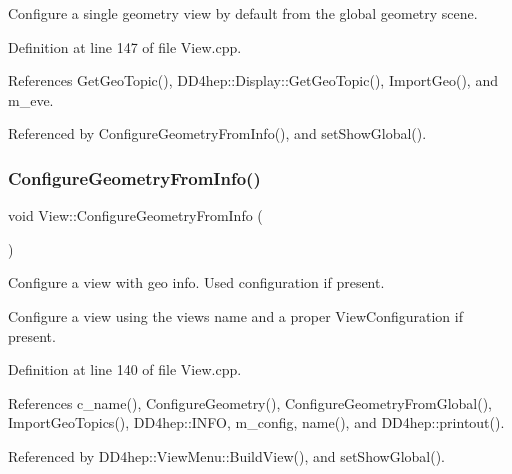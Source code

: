Configure a single geometry view by default from the global geometry scene. 

Definition at line 147 of file View.\+cpp.



References Get\+Geo\+Topic(), D\+D4hep\+::\+Display\+::\+Get\+Geo\+Topic(), Import\+Geo(), and m\+\_\+eve.



Referenced by Configure\+Geometry\+From\+Info(), and set\+Show\+Global().

\hypertarget{class_d_d4hep_1_1_view_af573f4aceff18a93fd91b2678de0ae8e}{}\label{class_d_d4hep_1_1_view_af573f4aceff18a93fd91b2678de0ae8e} 
\subsubsection{\texorpdfstring{Configure\+Geometry\+From\+Info()}{ConfigureGeometryFromInfo()}}
{\footnotesize\ttfamily void View\+::\+Configure\+Geometry\+From\+Info (\begin{DoxyParamCaption}{ }\end{DoxyParamCaption})\hspace{0.3cm}{\ttfamily [virtual]}}



Configure a view with geo info. Used configuration if present. 

Configure a view using the view\textquotesingle{}s name and a proper View\+Configuration if present. 

Definition at line 140 of file View.\+cpp.



References c\+\_\+name(), Configure\+Geometry(), Configure\+Geometry\+From\+Global(), Import\+Geo\+Topics(), D\+D4hep\+::\+I\+N\+FO, m\+\_\+config, name(), and D\+D4hep\+::printout().



Referenced by D\+D4hep\+::\+View\+Menu\+::\+Build\+View(), and set\+Show\+Global().

\hypertarget{class_d_d4hep_1_1_view_a405104d10cef9018701601ae5346d89d}{}\label{class_d_d4hep_1_1_view_a405104d10cef9018701601ae5346d89d} 
